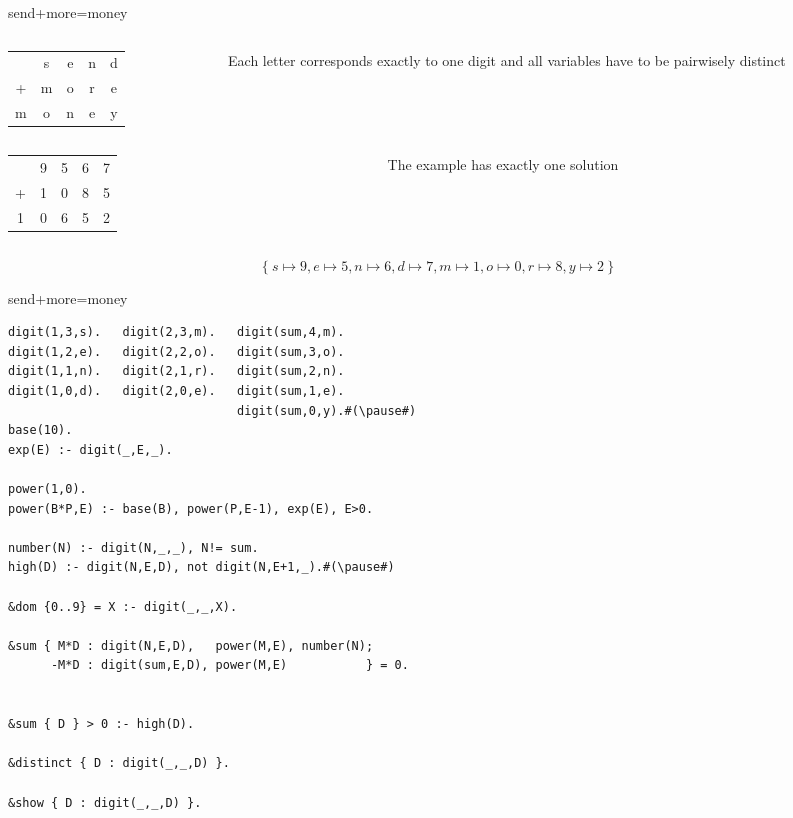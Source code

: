 \begin{frame}[c]{send+more=money}
  \begin{columns}
    \begin{column}{.35\textwidth}
      \begin{tabular}[t]{ccccc}
         &s&e&n&d\\
        +&m&o&r&e\\
        \hline
        m&o&n&e&y
      \end{tabular}
    \end{column}
    \begin{column}{.35\textwidth}
      Each letter corresponds exactly to one digit and all variables have to be
      pairwisely distinct
    \end{column}
  \end{columns}
\pause
\bigskip\bigskip
  \begin{columns}
    \begin{column}{.35\textwidth}
      \begin{tabular}[t]{ccccc}
         &9&5&6&7\\
        +&1&0&8&5\\
        \hline
        1&0&6&5&2
      \end{tabular}
    \end{column}
    \begin{column}{.35\textwidth}
      The example has exactly one solution
    \end{column}
  \end{columns}
\[
\{\ s\mapsto9, e\mapsto5, n\mapsto6, d\mapsto7, m\mapsto1, o\mapsto0, r\mapsto8, y\mapsto2\ \}
\]
\end{frame}
\begin{frame}[fragile,shrink=1]{send+more=money}
\begin{lstlisting}
digit(1,3,s).   digit(2,3,m).   digit(sum,4,m).
digit(1,2,e).   digit(2,2,o).   digit(sum,3,o).
digit(1,1,n).   digit(2,1,r).   digit(sum,2,n).
digit(1,0,d).   digit(2,0,e).   digit(sum,1,e).
                                digit(sum,0,y).#(\pause#)
base(10).
exp(E) :- digit(_,E,_).

power(1,0).
power(B*P,E) :- base(B), power(P,E-1), exp(E), E>0.

number(N) :- digit(N,_,_), N!= sum.
high(D) :- digit(N,E,D), not digit(N,E+1,_).#(\pause#)

&dom {0..9} = X :- digit(_,_,X).

&sum { M*D : digit(N,E,D),   power(M,E), number(N);
      -M*D : digit(sum,E,D), power(M,E)           } = 0.


&sum { D } > 0 :- high(D).

&distinct { D : digit(_,_,D) }.

&show { D : digit(_,_,D) }.
\end{lstlisting}
\end{frame}
